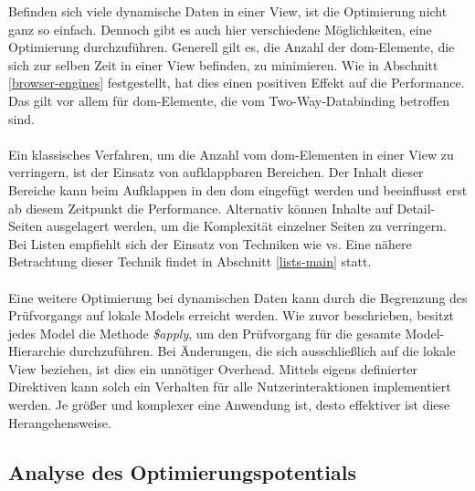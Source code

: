 Befinden sich viele dynamische Daten in einer View, ist die Optimierung nicht ganz so einfach. Dennoch gibt es auch hier verschiedene Möglichkeiten, eine Optimierung durchzuführen. Generell gilt es, die Anzahl der \gls{dom}-Elemente, die sich zur selben Zeit in einer View befinden, zu minimieren. Wie in Abschnitt \ref{browser-engines} festgestellt, hat dies einen positiven Effekt auf die Performance. Das gilt vor allem für \gls{dom}-Elemente, die vom Two-Way-Databinding betroffen sind. 
\\\\
Ein klassisches Verfahren, um die Anzahl vom \gls{dom}-Elementen in einer View zu verringern, ist der Einsatz von aufklappbaren Bereichen. Der Inhalt dieser Bereiche kann beim Aufklappen in den \gls{dom} eingefügt werden und beeinflusst erst ab diesem Zeitpunkt die Performance. Alternativ können Inhalte auf Detail-Seiten ausgelagert werden, um die Komplexität einzelner Seiten zu verringern. Bei Listen empfiehlt sich der Einsatz von Techniken wie \gls{vs}. Eine nähere Betrachtung dieser Technik findet in Abschnitt \ref{lists-main} statt.
\\\\
Eine weitere Optimierung bei dynamischen Daten kann durch die Begrenzung des Prüfvorgangs auf lokale Models erreicht werden. Wie zuvor beschrieben, besitzt jedes Model die Methode \emph{\$apply}, um den Prüfvorgang für die gesamte Model-Hierarchie durchzuführen. Bei Änderungen, die sich ausschließlich auf die lokale View beziehen, ist dies ein unnötiger Overhead. Mittels eigens definierter Direktiven kann solch ein Verhalten für alle Nutzerinteraktionen implementiert werden. Je größer und komplexer eine Anwendung ist, desto effektiver ist diese Herangehensweise.

\subsection{Analyse des Optimierungspotentials}
\label{dv-analyse}

